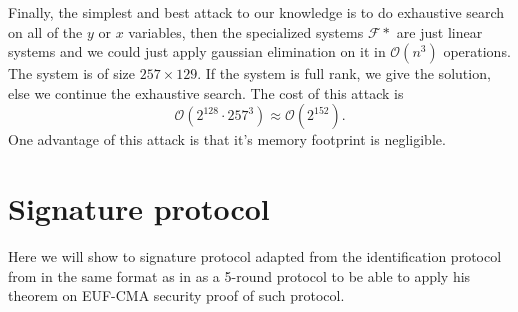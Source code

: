 \documentclass[english]{article}
\begin{document}
		Finally, the simplest and best attack to our knowledge is to do exhaustive search on all of the $y$ or $x$ variables, then the specialized systems $\mathcal{F}*$ are just linear systems and we could just apply gaussian elimination on it in $\mathcal{O}(n^3)$ operations. The system is of size $257 \times 129$. If the system is full rank, we give the solution, else we continue the exhaustive search. The cost of this attack is 
		$$
		\mathcal{O}(2^{128} \cdot 257^{3}) \approx \mathcal{O}(2^{152}).
		$$
		One advantage of this attack is that it's memory footprint is negligible.
\printbibliography

\appendix
\section{Signature protocol}
	Here we will show to signature protocol adapted from the identification protocol from \cite{HJ23} in the same format as in \cite{feneu2023} as a 5-round protocol to be able to apply his theorem on EUF-CMA security proof of such protocol.
		
\end{document}
